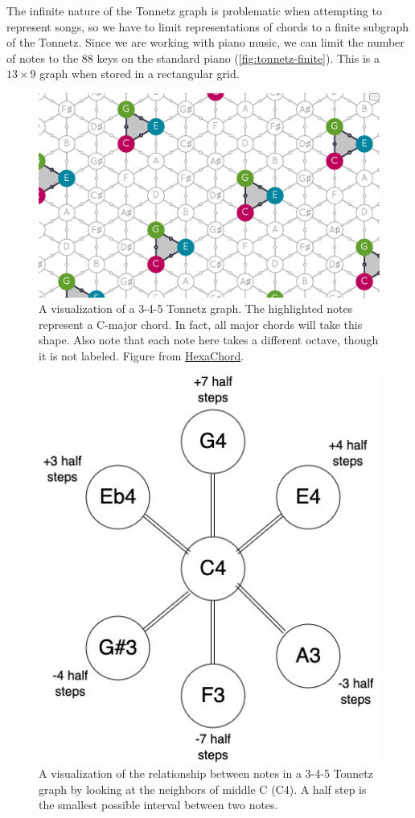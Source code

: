 \documentclass[
	a4paper, %
	10pt, %
	unnumberedsections, %
	twoside, %
]{LTJournalArticle}
\begin{document}
The infinite nature of the Tonnetz graph is problematic when attempting to represent songs, so we have to limit representations of chords to a finite subgraph of the Tonnetz. Since we are working with piano music, we can limit the number of notes to the 88 keys on the standard piano (\autoref{fig:tonnetz-finite}). This is a $13\times9$ graph when stored in a rectangular grid.

\begin{figure}
    \centering
    \includegraphics[width=\linewidth]{images/tonnetz-webhex.png}
    \caption{A visualization of a 3-4-5 Tonnetz graph. The highlighted notes represent a C-major chord. In fact, all major chords will take this shape. Also note that each note here takes a different octave, though it is not labeled. Figure from \href{https://guichaoua.gitlab.io/web-hexachord/}{HexaChord}.}
    \label{fig:tonnetz}
\end{figure}

\begin{figure}
    \centering
    \includegraphics[width=0.8\linewidth]{images/tonnetzC4.jpg}
    \caption{A visualization of the relationship between notes in a 3-4-5 Tonnetz graph by looking at the neighbors of middle C (C4). A half step is the smallest possible interval between two notes.}
    \label{fig:tonnetz-c4neigh}
\end{figure}
\end{document}
